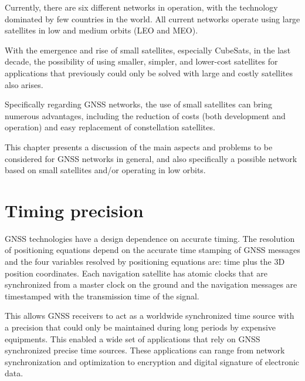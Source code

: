 Currently, there are six different networks in operation, with the technology dominated by few countries in the world. All current networks operate using large satellites in low and medium orbits (LEO and MEO).

With the emergence and rise of small satellites, especially CubeSats, in the last decade, the possibility of using smaller, simpler, and lower-cost satellites for applications that previously could only be solved with large and costly satellites also arises.

Specifically regarding GNSS networks, the use of small satellites can bring numerous advantages, including the reduction of costs (both development and operation) and easy replacement of constellation satellites.

This chapter presents a discussion of the main aspects and problems to be considered for GNSS networks in general, and also specifically a possible network based on small satellites and/or operating in low orbits.


\section{Timing precision}


GNSS technologies have a design dependence on accurate timing. The resolution of positioning equations depend on the accurate time stamping of GNSS messages and the four variables resolved by positioning equations are: time plus the 3D position coordinates. Each navigation satellite has atomic clocks that are synchronized from a master clock on the ground and the navigation messages are timestamped with the transmission time of the signal.

This allows GNSS receivers to act as a worldwide synchronized time source with a precision that could only be maintained during long periods by expensive equipments. This enabled a wide set of applications that rely on GNSS synchronized precise time sources. These applications can range from network synchronization and optimization to encryption and digital signature of electronic data.

